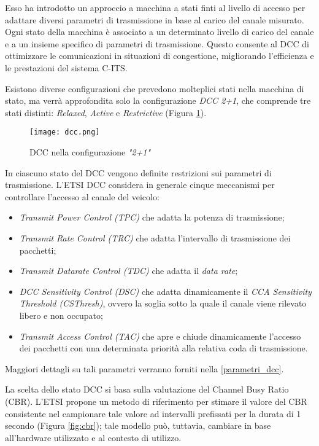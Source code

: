 Esso ha introdotto un approccio a macchina a stati finti al livello di accesso per adattare diversi parametri di trasmissione in base al carico del canale misurato. Ogni stato della macchina è associato a un determinato livello di carico del canale e a un insieme specifico di parametri di trasmissione. Questo consente al DCC di ottimizzare le comunicazioni in situazioni di congestione, migliorando l'efficienza e le prestazioni del sistema C-ITS.

Esistono diverse configurazioni che prevedono molteplici stati nella macchina di stato, ma verrà approfondita solo la configurazione \textit{DCC 2+1}, che comprende tre stati distinti: \textit{Relaxed}, \textit{Active} e \textit{Restrictive} (Figura \ref{fig:dcc}).

\begin{figure}[h!]
    \centering
    \texttt{[image: dcc.png]}
    \caption{DCC nella configurazione \textit{"2+1"}}
    \label{fig:dcc}
\end{figure}

In ciascuno stato del DCC vengono definite restrizioni sui parametri di trasmissione. L'ETSI DCC considera in generale cinque meccanismi per controllare l'accesso al canale del veicolo:

\begin{itemize}
    \item \textit{Transmit Power Control (TPC)} che adatta la potenza di trasmissione;
    \item \textit{Transmit Rate Control (TRC)} che adatta l'intervallo di trasmissione dei pacchetti;
    \item \textit{Transmit Datarate Control (TDC)} che adatta il \textit{data rate};
    \item \textit{DCC Sensitivity Control (DSC)} che adatta dinamicamente il \textit{CCA Sensitivity Threshold (CSThresh)}, ovvero la soglia sotto la quale il canale viene rilevato libero e non occupato;
    \item \textit{Transmit Access Control (TAC)} che apre e chiude dinamicamente l'accesso dei pacchetti con una determinata priorità alla relativa coda di trasmissione.
\end{itemize}

\noindent Maggiori dettagli su tali parametri verranno forniti nella \autoref{parametri_dcc}.

La scelta dello stato DCC si basa sulla valutazione del Channel Busy Ratio (CBR). L'ETSI propone un metodo di riferimento per stimare il valore del CBR consistente nel campionare tale valore ad intervalli prefissati per la durata di 1 secondo (Figura \ref{fig:cbr}); tale modello può, tuttavia, cambiare in base all'hardware utilizzato e al contesto di utilizzo.

